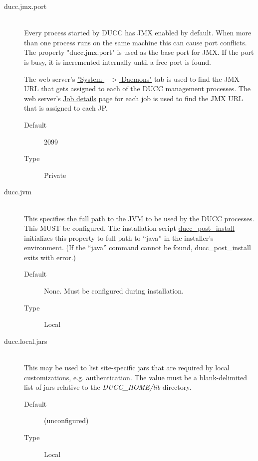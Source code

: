 \begin{description}
       \item[ducc.jmx.port] \hfill \\
         Every process started by DUCC has JMX enabled by default. When more than one process 
         runs on the same machine this can cause port conflicts. The property "ducc.jmx.port" is 
         used as the base port for JMX. If the port is busy, it is incremented internally until a free 
         port is found. 
         
         The web server's \hyperref[sec:system-details.daemons]{"System $->$ Daemons"} tab is used
         to find the JMX URL that gets assigned to each of the DUCC management processes. The web
         server's \hyperref[sec:ws-job-details]{Job details} page for each job is used to find the
         JMX URL that is assigned to each JP.
         
         \begin{description}
           \item[Default] 2099 
           \item[Type] Private 
         \end{description}

       \item[ducc.jvm] \hfill \\
         This specifies the full path to the JVM to be used by the DUCC processes. This MUST be
         configured.  The installation script
         \hyperref[subsec:admin.ducc-post-install]{ducc\_post\_install} initializes this property to 
         full path to ``java'' in the installer's environment.  (If the ``java'' command cannot
         be found, ducc\_post\_install exits with error.)
         \begin{description}
           \item[Default] None.  Must be configured during installation.
           \item[Type] Local 
         \end{description}

       \item[ducc.local.jars] \hfill \\
         This may be used to list site-specific jars that are required by local
         customizations, e.g. authentication.  The value must be a blank-delimited list of jars
         relative to the {\em DUCC\_HOME/lib} directory.
         \begin{description}
           \item[Default] (unconfigured) 
           \item[Type] Local
         \end{description}


\end{description}
